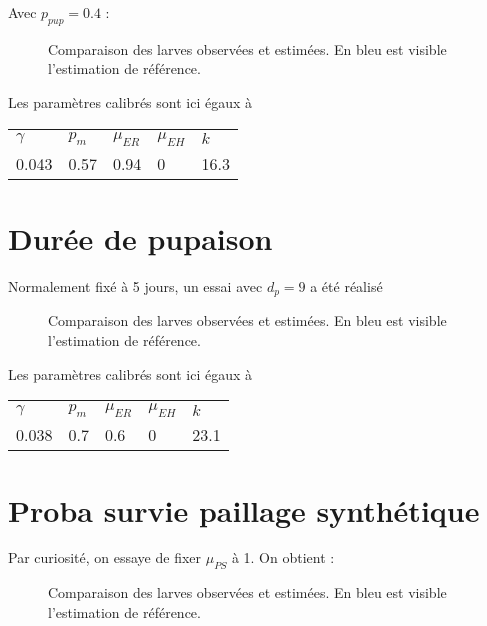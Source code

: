 \documentclass[a4paper, 11pt]{article}
\begin{document}
Avec $p_{pup} = 0.4$ : 


\begin{figure}[h]
 \centering
 \caption{Comparaison des larves observées et estimées. En bleu est visible l'estimation de référence.}
\end{figure}

Les paramètres calibrés sont ici égaux à 

\begin{center}
\begin{tabular}{lllll}
$\gamma$ & $p_m$ & $\mu_{ER}$ & $\mu_{EH}$ & $k$\\
0.043 & 0.57 & 0.94 & 0 & 16.3
\end{tabular}
\end{center}

\newpage
\section{Durée de pupaison}

Normalement fixé à 5 jours, un essai avec $d_p = 9$ a été réalisé

\begin{figure}[h]
 \centering
 \caption{Comparaison des larves observées et estimées. En bleu est visible l'estimation de référence.}
\end{figure}

Les paramètres calibrés sont ici égaux à 

\begin{center}
\begin{tabular}{lllll}
$\gamma$ & $p_m$ & $\mu_{ER}$ & $\mu_{EH}$ & $k$\\
0.038 & 0.7 & 0.6 & 0 & 23.1
\end{tabular}
\end{center}

\newpage
\section{Proba survie paillage synthétique}

Par curiosité, on essaye de fixer $\mu_{PS}$ à 1. On obtient :

\begin{figure}[h]
 \centering
 \caption{Comparaison des larves observées et estimées. En bleu est visible l'estimation de référence.}
\end{figure}
\end{document}
